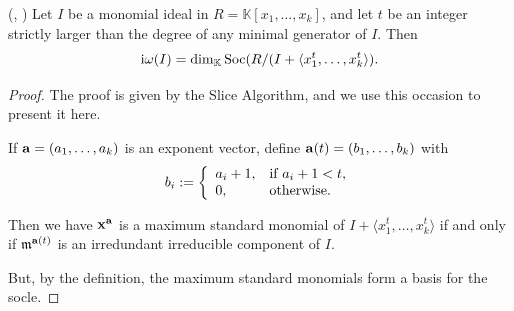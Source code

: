 \documentclass[11pt]{amsart}   %
\begin{document}
\begin{thm}\label{thm_msm} (\cite[Exercise 5.8]{MiSt}, \cite[Proposition 3 in Section 2.2]{Ro}) Let $I$ be a monomial ideal in $R=\mathbb K[x_1,\ldots,x_k]$, and let $t$ be an integer strictly larger than the degree of any minimal generator of $I$. Then
$${\rm i}\omega(I)=\dim_{\mathbb K}{\rm Soc}(R/(I+\langle x_1^t,\ldots,x_k^t\rangle).$$    
\end{thm}
\begin{proof} The proof is given by the Slice Algorithm, and we use this occasion to present it here. 

If ${\bf a}=(a_1,\ldots,a_k)$ is an exponent vector, define ${\bf a}(t)=(b_1,\ldots,b_k)$ with $$b_i:=\left\{
                          \begin{array}{ll}
                            a_i+1, & \hbox{if $a_i+1<t$,} \\
                            0, & \hbox{otherwise.}
                          \end{array}
                        \right.$$

Then we have ${\bf x}^{\bf a}$ is a maximum standard monomial of $I+\langle x_1^t,\ldots,x_k^t\rangle$ if and only if $\frak m^{{\bf a}(t)}$ is an irredundant irreducible component of $I$.

But, by the definition, the maximum standard monomials form a basis for the socle.
\end{proof}

\medskip 

\end{document}
